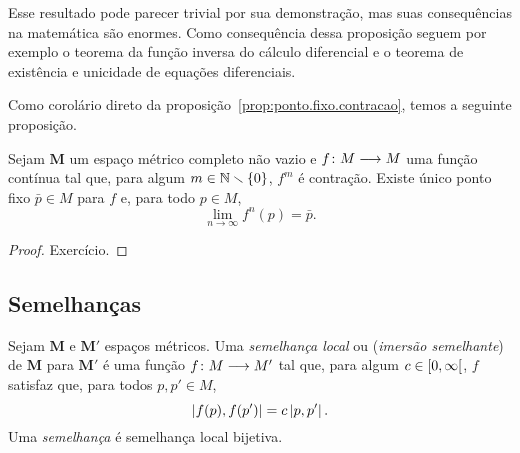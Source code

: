 Esse resultado pode parecer trivial por sua demonstração, mas suas consequências na matemática são enormes. Como consequência dessa proposição seguem por exemplo o teorema da função inversa do cálculo diferencial e o teorema de existência e unicidade de equações diferenciais.

Como corolário direto da proposição~\ref{prop:ponto.fixo.contracao}, temos a seguinte proposição.

\begin{proposition}
\label{prop:ponto.fixo.iterada.contracao}
Sejam $\bm M$ um espaço métrico completo não vazio e $f\colon \allowbreak M \longrightarrow M$ uma função contínua tal que, para algum $m \in \mathbb{N} \smallsetminus \{0\}$, $f^m$ é contração. Existe único ponto fixo $\bar p \in M$ para $f$ e, para todo $p \in M$,
	\begin{equation*}
	\lim_{n \to \infty} f^n(p) = \bar p.
	\end{equation*}
\end{proposition}
\begin{proof}
Exercício.
\end{proof}

\begin{comment}
Como $f^n$ é contração, pela proposição~\ref{prop:ponto.fixo.contracao} ela tem único ponto fixo $\bar p$ e vale que, para todo $p \in M$
	\begin{equation*}
	\lim_{n \to \infty} f^{mn}(p) = \bar p.
	\end{equation*}
Em particular, para $f(p)$ vale
	\begin{equation*}
	\bar p = \lim_{n \to \infty} f^{mn}(f(p)) = \lim_{n \to \infty} f(f^{mn}(p)) = f(\bar p),
	\end{equation*}
o que mostra que $\bar p$ é ponto fixo de $f$. Agora, para todo $n \in \N$, sejam $q, r \in \N$ tais que $n = mq+r$, com $0 \leq < m$. Para todo $p \in M$, segue que
	\begin{equation*}
	f^n(p) = (f^m)^q(f^r(p))
	\end{equation*}
\end{comment}







\subsection{Semelhanças}

\begin{definition}
Sejam $\bm{M}$ e $\bm{M'}$ espaços métricos. Uma \emph{semelhança local} ou (\emph{imersão semelhante}) de $\bm{M}$ para $\bm{M'}$ é uma função $f\colon \allowbreak M \longrightarrow M'$ tal que, para algum $c \in \left[0,\allowbreak \infty\right[$, $f$ satisfaz que, para todos $p,p' \in M$,
	\begin{equation*}
	\left\vert{f(p)},{f(p')}\right\vert = c \left\vert{p},{p'}\right\vert.
	\end{equation*}
Uma \emph{semelhança} é semelhança local bijetiva.
\end{definition}

